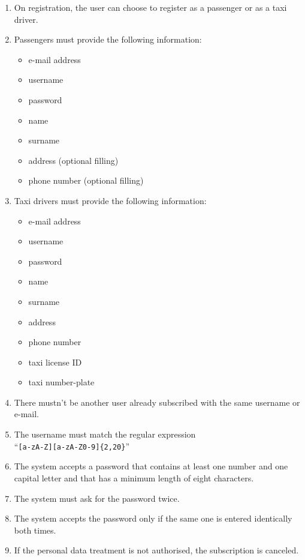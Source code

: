 \begin{enumerate}
    \item On registration, the user can choose to register as a passenger or as a taxi driver.
    \item Passengers must provide the following information:
    \begin{itemize}
        \item e-mail address
        \item username
        \item password
        \item name
        \item surname
        \item address (optional filling)
        \item phone number (optional filling)
    \end{itemize}
    \item Taxi drivers must provide the following information:
    \begin{itemize}
        \item e-mail address
        \item username
        \item password
        \item name
        \item surname
        \item address
        \item phone number
        \item taxi license ID
        \item taxi number-plate
    \end{itemize}
    \item There mustn't be another user already subscribed with the same username or e-mail. \label{f-sameInfo}
    \item The username must match the regular expression\\``\texttt{[a-zA-Z][a-zA-Z0-9]\{2,20\}}''    \label{f-usrn}
    \item The system accepts a password that contains at least one number and one capital letter and that has a minimum length of eight characters.  \label{f-psw1}
    \item The system must ask for the password twice.
    \item The system accepts the password only if the same one is entered identically both times. \label{f-psw2}
    \item If the personal data treatment is not authorised, the subscription is canceled. \label{f-dataTreat}

\end{enumerate}
